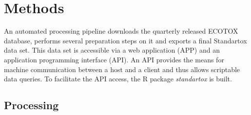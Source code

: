 \section{Methods}
An automated processing pipeline downloads the quarterly released ECOTOX database, performs several preparation steps on it and exports a final Standartox data set. This data set is accessible via a web application (APP) and an application programming interface (API). An API provides the means for machine communication between a host and a client and thus allows scriptable data queries. To facilitate the API access, the R \citep{rcoreteam_language_2017} package \textit{standartox} is built.

\subsection{Processing}
